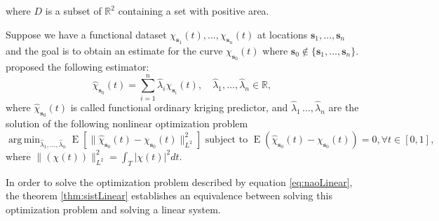 \documentclass[]{interact}
\theoremstyle{plain}%
\theoremstyle{definition}
\theoremstyle{remark}
\DeclareMathOperator{\espe}{E}
\DeclareMathOperator*{\argmin}{arg\,min}
\begin{document}
where \(D\) is a subset of \(\mathbb{R}^2\) containing a set with positive area.

Suppose we have a functional dataset \(\chi_{\bm{s}_1}(t), \dots, \chi_{\bm{s}_n}(t)\) at locations \(\bm{s}_1, \dots, \bm{s}_n\) and the goal is to obtain an estimate for the curve \(\chi_{\bm{s}_0}(t)\) where \(\bm{s}_0 \not\in \{\bm{s}_1, \dots, \bm{s}_n\}\). \citet{giraldo2011ordinary} proposed the following estimator:
\begin{equation}
\hat\chi_{\bm{s}_0} (t) = \sum_{i=1}^{n} \hat\lambda_i \chi_{\bm{s}_i}(t),\quad \hat\lambda_1, \dots, \hat\lambda_{n} \in \mathbb{R},
\label{eq:ModelOrdinary}
\end{equation}
where \(\hat\chi_{\bm{s}_0}(t)\) is called functional ordinary kriging predictor, and \(\hat\lambda_1\, \dots, \hat\lambda_{n}\) are the solution of the following nonlinear optimization problem
\begin{equation}
\argmin_{\hat{\lambda}_1, \dots, \hat{\lambda}_{n}} \espe \left[ \lVert\hat{\chi}_{\bm{s}_0}(t) - \chi_{\bm{s}_0}(t) \rVert^2_{L^2}\right] \mbox{ subject to }\espe(\hat{\chi}_{\bm{s}_0}(t) - \chi_{\bm{s}_0}(t)) =0, \forall t \in [0,1],
\label{eq:naoLinear}
\end{equation}
where \(\lVert(\chi(t))\rVert^2_{L^2}= \int_{T} \lvert \chi(t)\rvert^2 dt.\)

In order to solve the optimization problem described by equation \eqref{eq:naoLinear}, the theorem \ref{thm:sistLinear} establishes an equivalence between solving this optimization problem and solving a linear system.
\end{document}
